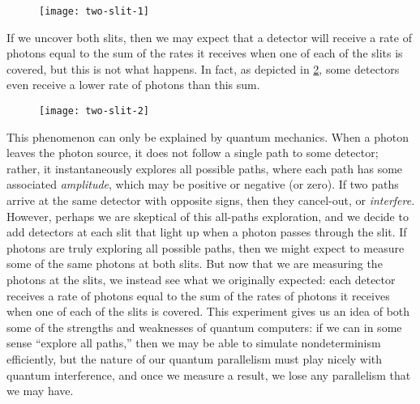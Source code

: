 \documentclass[12pt]{article}
\begin{document}
\begin{figure}[H]
  \texttt{[image: two-slit-1]}
  \caption{\cite[p. 203]{AB09}}
  \label{fig:two-slit-1}
\end{figure}

If we uncover both slits, then we may expect that a detector will receive a rate
of photons equal to the sum of the rates it receives when one of each of the
slits is covered, but this is not what happens. In fact, as depicted in
\cref{fig:two-slit-2}, some detectors even receive a lower rate of photons than
this sum.

\begin{figure}[H]
  \texttt{[image: two-slit-2]}
  \caption{\cite[p. 203]{AB09}}
  \label{fig:two-slit-2}
\end{figure}

This phenomenon can only be explained by quantum mechanics. When a photon leaves
the photon source, it does not follow a single path to some detector; rather, it
instantaneously explores all possible paths, where each path has some associated
\emph{amplitude}, which may be positive or negative (or zero). If two paths
arrive at the same detector with opposite signs, then they cancel-out, or
\emph{interfere}. However, perhaps we are skeptical of this all-paths
exploration, and we decide to add detectors at each slit that light up when a
photon passes through the slit. If photons are truly exploring all possible
paths, then we might expect to measure some of the same photons at both slits.
But now that we are measuring the photons at the slits, we instead see what we
originally expected: each detector receives a rate of photons equal to the
sum of the rates of photons it receives when one of each of the slits is
covered. This experiment gives us an idea of both some of the strengths and
weaknesses of quantum computers: if we can in some sense ``explore all paths,''
then we may be able to simulate nondeterminism efficiently, but the nature of
our quantum parallelism must play nicely with quantum interference, and once we
measure a result, we lose any parallelism that we may have.
\end{document}
